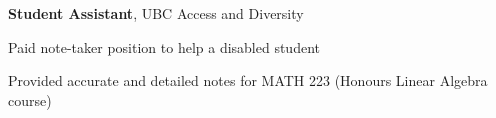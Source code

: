 \documentclass[margin,line]{res}
\newenvironment{list3}{
  \begin{list}{\textopenbullet}{
      \setlength{\itemsep}{0in}
      \setlength{\parsep}{0in} \setlength{\parskip}{0in}
      \setlength{\topsep}{0in} \setlength{\partopsep}{0in} 
      \setlength{\leftmargin}{0.1in}}}{\end{list}}
\begin{document}
\begin{resume}
{\bf Student Assistant}, UBC Access and Diversity\\
\vspace*{-.3cm}
\begin{list3}
\item Paid note-taker position to help a disabled student 
\item Provided accurate and detailed notes for MATH 223 (Honours Linear Algebra course)
\end{list3}

\end{resume}
\end{document}
